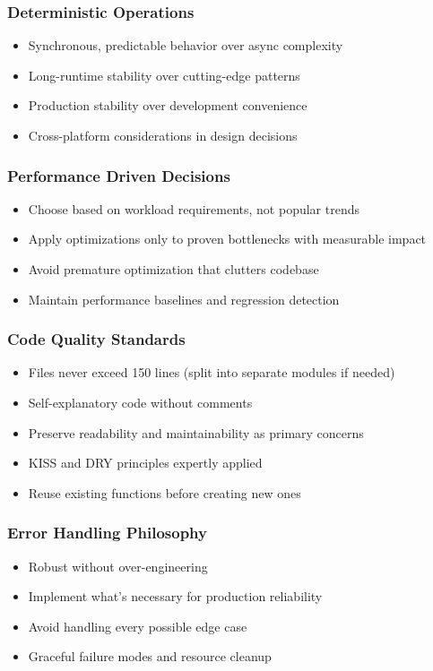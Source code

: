 \documentclass{article}
\begin{document}
\subsubsection{Deterministic Operations}
\begin{itemize}[noitemsep]
\item Synchronous, predictable behavior over async complexity
\item Long-runtime stability over cutting-edge patterns
\item Production stability over development convenience
\item Cross-platform considerations in design decisions
\end{itemize}

\subsubsection{Performance Driven Decisions}
\begin{itemize}[noitemsep]
\item Choose based on workload requirements, not popular trends
\item Apply optimizations only to proven bottlenecks with measurable impact
\item Avoid premature optimization that clutters codebase
\item Maintain performance baselines and regression detection
\end{itemize}

\subsubsection{Code Quality Standards}
\begin{itemize}[noitemsep]
\item Files never exceed 150 lines (split into separate modules if needed)
\item Self-explanatory code without comments
\item Preserve readability and maintainability as primary concerns
\item KISS and DRY principles expertly applied
\item Reuse existing functions before creating new ones
\end{itemize}

\subsubsection{Error Handling Philosophy}
\begin{itemize}[noitemsep]
\item Robust without over-engineering
\item Implement what's necessary for production reliability
\item Avoid handling every possible edge case
\item Graceful failure modes and resource cleanup
\end{itemize}
\end{document}
